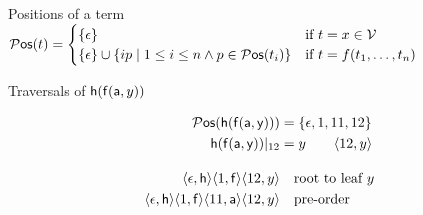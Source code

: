 

\begin{block}{Positions of a term}
$
	{}{\mathcal P}\mathsf{os}(t) =  
	\begin{cases}
		\{ \epsilon \} & \text{if }t=x\in{\mathcal V} \\
		\{ \epsilon \} \cup \{ ip\mid 1\leq i\leq n \land p\in{}{\mathcal P}\mathsf{os}(t_i)\} &
		\text{if }t=f(t_1,\ldots,t_n)
	\end{cases}
$
\end{block}

%

\begin{block}{Traversals of ${\mathsf h}({\mathsf f}({\mathsf a},y))$}
	\vspace{-1em}
\begin{minipage}[c]{3.1cm}
\end{minipage}
%
\begin{minipage}[c]{8.5cm}
\begin{align*}
\Pos(\mh(\mf(\ma,\my))) &= \{ \epsilon, 1, 11, 12 \}
\\
\mh(\mf(\ma,\my))|_{12} &= y \tag*{$\ANGLES{12,y}$}
\\[1em]
\ANGLES{\epsilon,\mh}\ANGLES{1,\mf}\ANGLES{12,y}
&\quad 
\text{root to leaf $y$} 
\\
\ANGLES{\epsilon,\mh}\ANGLES{1,\mf}\ANGLES{11,\ma}\ANGLES{12,y}
&\quad
\text{pre-order} 
\end{align*}
%
\end{minipage}
\end{block}
